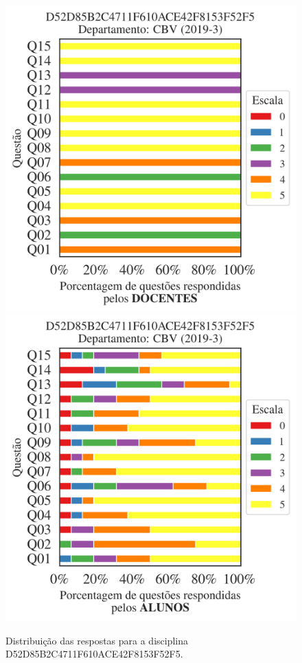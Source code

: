 \documentclass[a4paper,10pt]{article}
\begin{document}
\begin{figure}[h]
\centering
\includegraphics[width=0.485\linewidth]{analise_disciplina_departamento_CBV_D52D85B2C4711F610ACE42F8153F52F5_docentes.png}
\includegraphics[width=0.485\linewidth]{analise_disciplina_departamento_CBV_D52D85B2C4711F610ACE42F8153F52F5_alunos.png}
\caption{\label{fig:analise_geral_departamento}                Distribuição das respostas para a disciplina D52D85B2C4711F610ACE42F8153F52F5. }
\end{figure}
\end{document}
